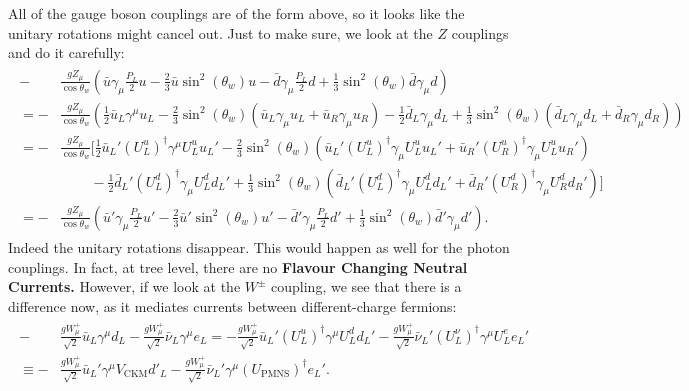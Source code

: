 \documentclass[a4paper, 11pt, normalem]{report}
\begin{document}
All of the gauge boson couplings are of the form above, so it looks like the unitary rotations might cancel out.
Just to make sure, we look at the $Z$ couplings and do it carefully:
\begin{align}
    \begin{split}
        -&\frac{gZ_\mu}{\cos\theta_w}\left(\bar{u}\gamma_\mu\frac{P_L}{2}u - \frac23\bar{u}\sin^2(\theta_w)u - \bar{d}\gamma_\mu\frac{P_L}{2}d + \frac13\sin^2(\theta_w)\bar{d}\gamma_\mu d\right) \\
       =-&\frac{gZ_\mu}{\cos\theta_w}\left(\frac12\bar{u}_L\gamma^\mu u_L - \frac23\sin^2(\theta_w)(\bar{u}_L\gamma_\mu u_L + \bar{u}_R\gamma_\mu u_R) - \frac12\bar{d}_L\gamma_\mu d_L + \frac13\sin^2(\theta_w)(\bar{d}_L\gamma_\mu d_L + \bar{d}_R\gamma_\mu d_R)\right) \\
       =-&\frac{gZ_\mu}{\cos\theta_w}\bigg[\frac12\bar{u}_L'(U_L^u)^\dagger\gamma^\mu U_L^uu_L' - \frac23\sin^2(\theta_w)\left(\bar{u}_L'(U_L^u)^\dagger\gamma_\mu U_L^uu_L'+\bar{u}_R'(U_R^u)^\dagger\gamma_\mu U_L^uu_R'\right) \\
         &\quad\quad\, -\frac12\bar{d}_L'(U_L^d)^\dagger\gamma_\mu U_L^dd_L' + \frac13\sin^2(\theta_w)\left(\bar{d}_L'(U_L^d)^\dagger\gamma_\mu U_L^dd_L' + \bar{d}_R'(U_R^d)^\dagger\gamma_\mu U_R^dd_R'\right)\bigg] \\
       =-&\frac{gZ_\mu}{\cos\theta_w}\left(\bar{u}'\gamma_\mu\frac{P_L}{2}u' - \frac23\bar{u}'\sin^2(\theta_w)u' - \bar{d}'\gamma_\mu\frac{P_L}{2}d' + \frac13\sin^2(\theta_w)\bar{d}'\gamma_\mu d'\right).
    \end{split}
\end{align}
Indeed the unitary rotations disappear.
This would happen as well for the photon couplings.
In fact, at tree level, there are no \textbf{Flavour Changing Neutral Currents.}
However, if we look at the $W^\pm$ coupling, we see that there is a difference now, as it mediates currents between different-charge fermions:
\begin{align}
    \begin{split}
        -&\frac{gW_\mu^+}{\sqrt{2}}\bar{u}_L\gamma^\mu d_L - \frac{gW_\mu^+}{\sqrt{2}}\bar{\nu}_L\gamma^\mu e_L = -\frac{gW_\mu^+}{\sqrt{2}}\bar{u}_L'(U_L^u)^\dagger\gamma^\mu U_L^dd_L' - \frac{gW_\mu^+}{\sqrt{2}}\bar{\nu}_L'(U_L^\nu)^\dagger\gamma^\mu U_L^ee_L' \\
        \equiv-&\frac{gW_\mu^+}{\sqrt{2}}\bar{u}_L'\gamma^\mu V_{\text{CKM}}d'_L - \frac{gW_\mu^+}{\sqrt{2}}\bar{\nu}_L'\gamma^\mu(U_{\text{PMNS}})^\dagger e_L'.
    \end{split}
\end{align}
\end{document}
